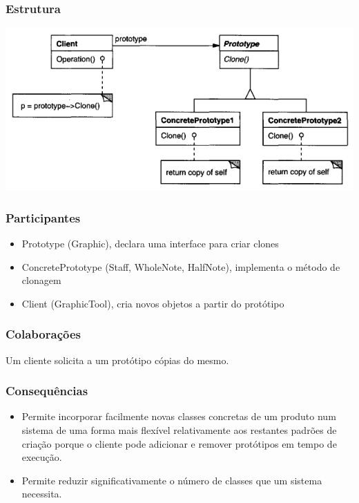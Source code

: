 \subsubsection{Estrutura}

\centerline{\includegraphics[scale=.7]{img/prototype/structure.png}}

\subsubsection{Participantes}
\begin{itemize}
\item Prototype (Graphic), declara uma interface para criar clones
\item ConcretePrototype (Staff, WholeNote, HalfNote), implementa o método de clonagem
\item Client (GraphicTool), cria novos objetos a partir do protótipo
\end{itemize}

\subsubsection{Colaborações}

Um cliente solicita a um protótipo cópias do mesmo.

\subsubsection{Consequências}
\begin{itemize}
\item Permite incorporar facilmente novas classes concretas de um produto num sistema de uma forma mais flexível relativamente aos restantes padrões de criação porque o cliente pode adicionar e remover protótipos em tempo de execução.
\item Permite reduzir significativamente o número de classes que um sistema necessita.
\end{itemize}


